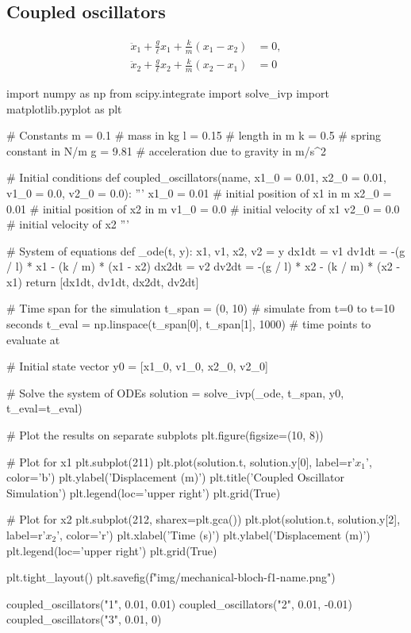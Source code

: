 \subsection{Coupled oscillators}

\[
\begin{aligned}
  \ddot{x}_1 + \frac{g}{\ell} x_1 + \frac{k}{m} (x_1 - x_2) &= 0, \\
  \ddot{x}_2 + \frac{g}{\ell} x_2 + \frac{k}{m} (x_2 - x_1) &= 0
\end{aligned}
\]


\begin{python}
import numpy as np
from scipy.integrate import solve_ivp
import matplotlib.pyplot as plt

# Constants
m = 0.1  # mass in kg
l = 0.15  # length in m
k = 0.5  # spring constant in N/m
g = 9.81  # acceleration due to gravity in m/s^2

# Initial conditions
def coupled_oscillators(name, x1_0 = 0.01, x2_0 = 0.01, v1_0 = 0.0, v2_0 = 0.0):
  '''
  x1_0 = 0.01  # initial position of x1 in m
  x2_0 = 0.01  # initial position of x2 in m
  v1_0 = 0.0  # initial velocity of x1
  v2_0 = 0.0  # initial velocity of x2
  '''

  # System of equations
  def _ode(t, y):
    x1, v1, x2, v2 = y
    dx1dt = v1
    dv1dt = -(g / l) * x1 - (k / m) * (x1 - x2)
    dx2dt = v2
    dv2dt = -(g / l) * x2 - (k / m) * (x2 - x1)
    return [dx1dt, dv1dt, dx2dt, dv2dt]

  # Time span for the simulation
  t_span = (0, 10)  # simulate from t=0 to t=10 seconds
  t_eval = np.linspace(t_span[0], t_span[1], 1000)  # time points to evaluate at

  # Initial state vector
  y0 = [x1_0, v1_0, x2_0, v2_0]

  # Solve the system of ODEs
  solution = solve_ivp(_ode, t_span, y0, t_eval=t_eval)

  # Plot the results on separate subplots
  plt.figure(figsize=(10, 8))

  # Plot for x1
  plt.subplot(211)
  plt.plot(solution.t, solution.y[0], label=r'$x_1$', color='b')
  plt.ylabel('Displacement (m)')
  plt.title('Coupled Oscillator Simulation')
  plt.legend(loc='upper right')
  plt.grid(True)

  # Plot for x2
  plt.subplot(212, sharex=plt.gca())
  plt.plot(solution.t, solution.y[2], label=r'$x_2$', color='r')
  plt.xlabel('Time (s)')
  plt.ylabel('Displacement (m)')
  plt.legend(loc='upper right')
  plt.grid(True)

  plt.tight_layout()
  plt.savefig(f"img/mechanical-bloch-f1-{name}.png")

coupled_oscillators("1", 0.01, 0.01)
coupled_oscillators("2", 0.01, -0.01)
coupled_oscillators("3", 0.01, 0)
\end{python}

